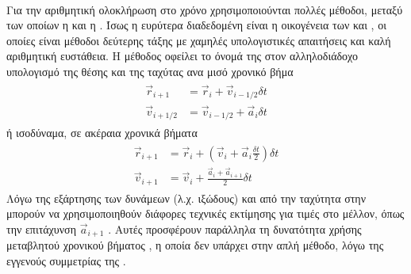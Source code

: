 \paragraph{} Για την αριθμητική ολοκλήρωση στο χρόνο χρησιμοποιούνται πολλές μέθοδοι,
μεταξύ των οποίων η  και η . Ίσως η
ευρύτερα διαδεδομένη είναι η οικογένεια των  και ,
οι οποίες είναι μέθοδοι δεύτερης τάξης με χαμηλές υπολογιστικές απαιτήσεις και καλή
αριθμητική ευστάθεια. Η μέθοδος  οφείλει το όνομά της στον αλληλοδιάδοχο
υπολογισμό της θέσης και της ταχύτας ανα μισό χρονικό βήμα
\begin{align}
  \begin{split}
    \label{eq:leapfrog}
    \vec{r}_{i+1} &= \vec{r}_i + \vec{v}_{i-1/2} \delta t \\
    \vec{v}_{i+1/2} &= \vec{v}_{i-1/2} + \vec{a}_i \delta t
  \end{split}
\end{align}
ή ισοδύναμα, σε ακέραια χρονικά βήματα
\begin{align}
  \begin{split}
    \label{eq:leapfrog}
    \vec{r}_{i+1} &= \vec{r}_i + \left( \vec{v}_i + \vec{a}_i \frac{\delta t}{2} \right) \delta t \\
    \vec{v}_{i+1} &= \vec{v}_i + \frac{\vec{a}_i + \vec{a}_{i+1}}{2} \delta t
  \end{split}
\end{align}
Λόγω της εξάρτησης των δυνάμεων (λ.χ. ιξώδους) και από την ταχύτητα στην  μπορούν
να χρησιμοποιηθούν διάφορες τεχνικές εκτίμησης για τιμές στο μέλλον, όπως την επιτάχυνση
$\vec{a}_{i+1}$
\cite{rawiraswattana2012dynamics}.  Αυτές προσφέρουν παράλληλα τη δυνατότητα χρήσης
μεταβλητού χρονικού βήματος \cite{springel2001gadget}, η οποία δεν υπάρχει στην απλή
 μέθοδο, λόγω της εγγενούς συμμετρίας της \cite{skeel1993variable}.

